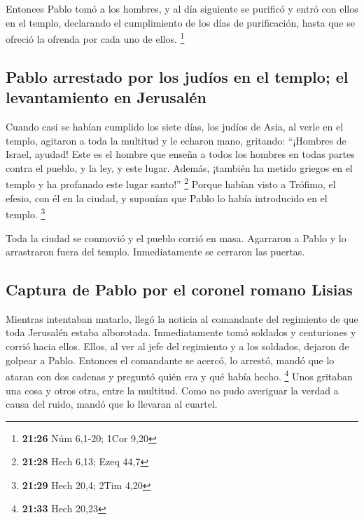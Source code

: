 \begin{paracol}{2}
 Entonces Pablo tomó a los hombres, y al día siguiente se
purificó y entró con ellos en el templo, declarando el cumplimiento de
los días de purificación, hasta que se ofreció la ofrenda por cada uno
de ellos. \footnote{\textbf{21:26} Núm 6,1-20; 1Cor 9,20}

\hypertarget{pablo-arrestado-por-los-juduxedos-en-el-templo-el-levantamiento-en-jerusaluxe9n}{%
\subsection{Pablo arrestado por los judíos en el templo; el
levantamiento en
Jerusalén}\label{pablo-arrestado-por-los-juduxedos-en-el-templo-el-levantamiento-en-jerusaluxe9n}}

 Cuando casi se habían cumplido los siete días, los
judíos de Asia, al verle en el templo, agitaron a toda la multitud y le
echaron mano,  gritando: ``¡Hombres de Israel, ayudad!
Este es el hombre que enseña a todos los hombres en todas partes contra
el pueblo, y la ley, y este lugar. Además, ¡también ha metido griegos en
el templo y ha profanado este lugar santo!'' \footnote{\textbf{21:28}
  Hech 6,13; Ezeq 44,7}  Porque habían visto a Trófimo,
el efesio, con él en la ciudad, y suponían que Pablo lo había
introducido en el templo. \footnote{\textbf{21:29} Hech 20,4; 2Tim 4,20}

 Toda la ciudad se conmovió y el pueblo corrió en masa.
Agarraron a Pablo y lo arrastraron fuera del templo. Inmediatamente se
cerraron las puertas.

\hypertarget{captura-de-pablo-por-el-coronel-romano-lisias}{%
\subsection{Captura de Pablo por el coronel romano
Lisias}\label{captura-de-pablo-por-el-coronel-romano-lisias}}

 Mientras intentaban matarlo, llegó la noticia al
comandante del regimiento de que toda Jerusalén estaba alborotada.
 Inmediatamente tomó soldados y centuriones y corrió
hacia ellos. Ellos, al ver al jefe del regimiento y a los soldados,
dejaron de golpear a Pablo.  Entonces el comandante se
acercó, lo arrestó, mandó que lo ataran con dos cadenas y preguntó quién
era y qué había hecho. \footnote{\textbf{21:33} Hech 20,23}
 Unos gritaban una cosa y otros otra, entre la multitud.
Como no pudo averiguar la verdad a causa del ruido, mandó que lo
llevaran al cuartel.


\end{paracol}
